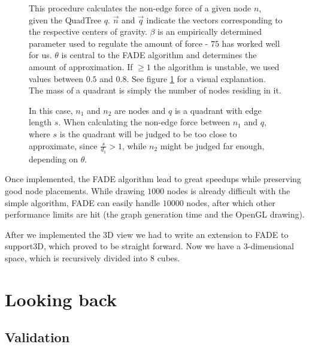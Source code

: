 \documentclass[a4paper,11pt,titlepage]{article}
\let\stdsection\section         %
\renewcommand{\section}{\newpage\stdsection}
\begin{document}
\begin{figure}[ht]
  \begin{minipage}[b]{0.5\linewidth}
    
    \caption{This procedure calculates the non-edge force of a given
      node \(n\), given the QuadTree \(q\). \(\vec{n}\) and
      \(\vec{q}\) indicate the vectors corresponding to the respective
      centers of gravity. \(\beta\) is an empirically determined
      parameter used to regulate the amount of force - \(75\) has
      worked well for us. \(\theta\) is central to the FADE algorithm
      and determines the amount of approximation. If \(\geq 1\) the
      algorithm is unstable, we used values between \(0.5\) and
      \(0.8\). See figure \ref{fig:theta} for a visual
      explanation. The mass of a quadrant is simply the number of
      nodes residing in it. }
    \label{proc:FADE}
  \end{minipage}
  \hspace{10pt}
  \begin{minipage}[b]{0.5\linewidth}
    \centering
    
    \caption{In this case, \(n_1\) and \(n_2\) are nodes and \(q\) is
      a quadrant with edge length \(s\). When calculating the non-edge
      force between \(n_1\) and \(q\), where \(s\) is the quadrant
      will be judged to be too close to approximate, since
      \(\frac{s}{d_1} > 1\), while \(n_2\) might be judged far enough,
      depending on \(\theta\).}
    \label{fig:theta}
  \end{minipage}
\end{figure}

Once implemented, the FADE algorithm lead to great speedups while
preserving good node placements. While drawing \(1000\) nodes is
already difficult with the simple algorithm, FADE can easily handle
\(10000\) nodes, after which other performance limits are hit (the
graph generation time and the OpenGL drawing).

After we implemented the 3D view we had to write an extension to FADE to support3D, which proved to be straight forward. Now we have a 3-dimensional space,
which is recursively divided into $8$ cubes.

\section{Looking back}

\subsection{Validation}
\end{document}
